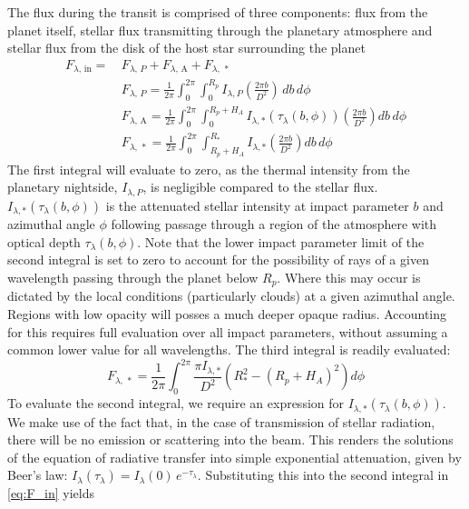 \documentclass[fleqn,usenatbib]{mnras}
\begin{document}
The flux during the transit is comprised of three components: flux from the planet itself, stellar flux transmitting through the planetary atmosphere and stellar flux from the disk of the host star surrounding the planet
%
\begin{equation}
\begin{split}
F_{\lambda, \, \mathrm{in}} = \, & F_{\lambda, \, P} + F_{\lambda, \, \mathrm{A}} + F_{\lambda, \, *} \\
& F_{\lambda, \, P} = \frac{1}{2\pi} \int_{0}^{2\pi} \int_{0}^{R_p} I_{\lambda,P} \left(\frac{2\pi b}{D^2}\right) \, db \, d\phi \\
& F_{\lambda, \, \mathrm{A}} = \frac{1}{2\pi} \int_{0}^{2\pi} \int_{0}^{R_p+ H_A} I_{\lambda,*}(\tau_{\lambda}(b, \phi)) \left(\frac{2\pi b}{D^2}\right) db \, d\phi \\ 
& F_{\lambda, \, *} = \frac{1}{2\pi} \int_{0}^{2\pi} \int_{R_p + H_A}^{R_*} I_{\lambda,*} \left(\frac{2\pi b}{D^2}\right) db \, d\phi
\label{eq:F_in}
\end{split}
\end{equation}
%
The first integral will evaluate to zero, as the thermal intensity from the planetary nightside, $I_{\lambda,P}$, is negligible compared to the stellar flux. $I_{\lambda,*}(\tau_{\lambda}(b, \phi))$ is the attenuated stellar intensity at impact parameter $b$ and azimuthal angle $\phi$ following passage through a region of the atmosphere with optical depth $\tau_{\lambda}(b, \phi)$. Note that the lower impact parameter limit of the second integral is set to zero to account for the possibility of rays of a given wavelength passing through the planet below $R_p$. Where this may occur is dictated by the local conditions (particularly clouds) at a given azimuthal angle. Regions with low opacity will posses a much deeper opaque radius. Accounting for this requires full evaluation over all impact parameters, without assuming a common lower value for all wavelengths. The third integral is readily evaluated:
%
\begin{equation}
F_{\lambda, \, *} = \frac{1}{2\pi} \int_{0}^{2\pi} \frac{\pi I_{\lambda,*}}{D^2} \left(R_*^2 - (R_p + H_A)^2 \right) d\phi
\label{eq:3rd_term_F_in}
\end{equation}
%
To evaluate the second integral, we require an expression for $I_{\lambda,*}(\tau_{\lambda}(b, \phi))$. We make use of the fact that, in the case of transmission of stellar radiation, there will be no emission or scattering into the beam. This renders the solutions of the equation of radiative transfer into simple exponential attenuation, given by Beer's law: $I_{\lambda}(\tau_{\lambda}) = I_{\lambda}(0) \, e^{-\tau_{\lambda}}$. Substituting this into the second integral in \ref{eq:F_in} yields
\end{document}
